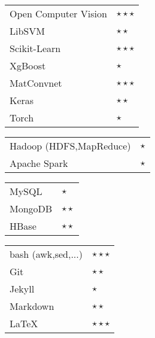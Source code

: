 \documentclass[11pt,a4paper,sans]{moderncv}
\begin{document}
\cvitem{}
{
\hspace{10mm}\begin{tabular}{p{5cm}l}
Open Computer Vision & $\star\star\star$ \\
LibSVM & $\star\star$ \\
Scikit-Learn & $\star\star\star$ \\
XgBoost & $\star$ \\
MatConvnet & $\star\star\star$ \\
Keras & $\star\star$ \\
Torch & $\star$ \\
\end{tabular}
\linebreak
}

\cvitem{}
{
\hspace{10mm}\begin{tabular}{p{5cm}l}
Hadoop (HDFS,MapReduce) & $\star$ \\
Apache Spark & $\star$ \\
\end{tabular}
\linebreak
}
\cvitem{}
{
\hspace{10mm}\begin{tabular}{p{5cm}l}
MySQL & $\star$ \\
MongoDB & $\star\star$ \\
HBase & $\star\star$ \\
\end{tabular}
\linebreak
}

\cvitem{}
{
\hspace{10mm}\begin{tabular}{p{5cm}l}
bash  (awk,sed,...) & $\star\star\star$ \\
Git  & $\star\star$ \\
Jekyll  & $\star$ \\
Markdown  & $\star\star$ \\
\LaTeX  & $\star\star\star$ \\
\end{tabular}
\linebreak
}



\end{document}
